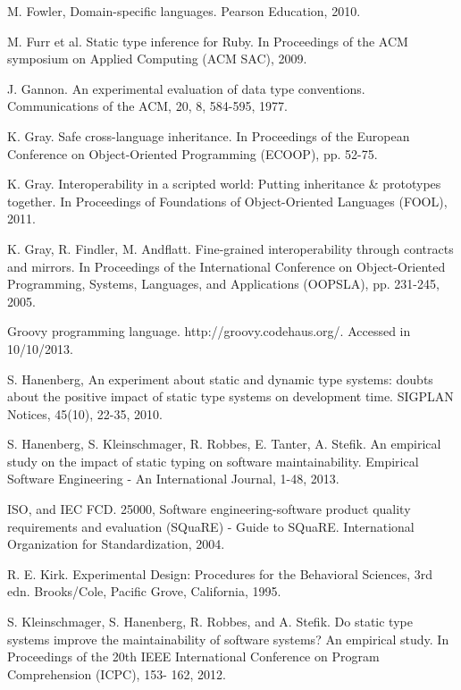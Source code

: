 \documentclass[msc]{ppgccufmg}
\begin{document}
\begin{thebibliography}{}
M. Fowler, Domain-specific languages. Pearson Education, 2010.

M. Furr et al. Static type inference for Ruby. In Proceedings of the ACM symposium on Applied Computing (ACM SAC), 2009.

J. Gannon.  An experimental evaluation of data type conventions. Communications of the ACM, 20, 8, 584-595, 1977.

K. Gray. Safe cross-language inheritance. In Proceedings of the European Conference on Object-Oriented Programming (ECOOP), pp. 52-75.

K. Gray. Interoperability in a scripted world: Putting inheritance \& prototypes together. In Proceedings of Foundations of Object-Oriented Languages (FOOL), 2011.

K. Gray, R. Findler, M. Andflatt. Fine-grained interoperability through contracts and mirrors. In Proceedings of the International Conference on Object-Oriented Programming, Systems, Languages, and Applications (OOPSLA), pp. 231-245, 2005.

Groovy programming language. http://groovy.codehaus.org/. Accessed in 10/10/2013.

S. Hanenberg, An experiment about static and dynamic type systems: doubts about the positive impact of static type systems on development time. SIGPLAN Notices, 45(10), 22-35, 2010.

S. Hanenberg, S. Kleinschmager, R. Robbes, E. Tanter, A. Stefik. An empirical study on the impact of static typing on software maintainability. Empirical Software Engineering - An International Journal, 1-48, 2013.

ISO, and IEC FCD. 25000, Software engineering-software product quality requirements and evaluation (SQuaRE) - Guide to SQuaRE. International Organization for Standardization, 2004.

R. E. Kirk. Experimental Design: Procedures for the Behavioral Sciences, 3rd edn. Brooks/Cole, Pacific Grove, California, 1995.

S. Kleinschmager, S. Hanenberg, R. Robbes, and A. Stefik. Do static type systems improve the maintainability of software systems? An empirical study. In Proceedings of the 20th IEEE International Conference on Program Comprehension (ICPC), 153- 162, 2012.


\end{thebibliography}
\end{document}
